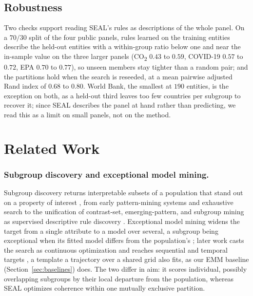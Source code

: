 \documentclass[runningheads]{llncs}
\begin{document}
\subsection{Robustness}
\label{sec:robust}
Two checks support reading \textsc{SEAL}'s rules as descriptions of the whole panel. On a $70/30$ split of the four public panels, rules learned on the training entities describe the held-out entities with a within-group ratio below one and near the in-sample value on the three larger panels (CO\textsubscript{2} $0.43$ to $0.59$, COVID-19 $0.57$ to $0.72$, EPA $0.70$ to $0.77$), so unseen members stay tighter than a random pair; and the partitions hold when the search is reseeded, at a mean pairwise adjusted Rand index of $0.68$ to $0.80$. World Bank, the smallest at $190$ entities, is the exception on both, as a held-out third leaves too few countries per subgroup to recover it; since \textsc{SEAL} describes the panel at hand rather than predicting, we read this as a limit on small panels, not on the method.

\section{Related Work}
\label{sec:related}

\subsubsection{Subgroup discovery and exceptional model mining.}
Subgroup discovery returns interpretable subsets of a population that stand out on a property of interest \citep{atzmueller2015subgroup,herrera2011overview}, from early pattern-mining systems \citep{klosgen1996explora,wrobel1997midos} and exhaustive search \citep{atzmueller2006sdmap} to the unification of contrast-set, emerging-pattern, and subgroup mining as supervised descriptive rule discovery \citep{novak2009supervised}. Exceptional model mining widens the target from a single attribute to a model over several, a subgroup being exceptional when its fitted model differs from the population's \citep{leman2008emm,duivesteijn2016emm}; later work casts the search as continuous optimization \citep{xu2024syflow} and reaches sequential and temporal targets \citep{lemmerich2016transition,hudson2021local,kiefer2022subgroup}, a template a trajectory over a shared grid also fits, as our EMM baseline (Section~\ref{sec:baselines}) does. The two differ in aim: it scores individual, possibly overlapping subgroups by their local departure from the population, whereas \textsc{SEAL} optimizes coherence within one mutually exclusive partition.
\end{document}
